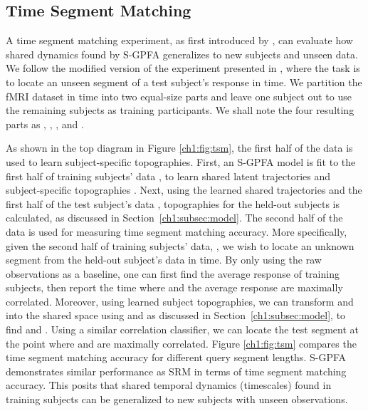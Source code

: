 \subsection{Time Segment Matching}
A time segment matching experiment, as first introduced by \cite{ha}, can evaluate how shared dynamics found by S-GPFA generalizes to new subjects and unseen data. We follow the modified version of the experiment presented in \cite{srm}, where the task is to locate an unseen segment of a test subject's response in time. We partition the fMRI dataset in time into two equal-size parts and leave one subject out to use the remaining subjects as training participants. We shall note the four resulting parts as , , , and .

As shown in the top diagram in Figure \ref{ch1:fig:tsm}, the first half of the data is used to learn subject-specific topographies. First, an S-GPFA model is fit to the first half of training subjects' data , to learn shared latent trajectories  and subject-specific topographies \wtrain. Next, using the learned shared trajectories  and the first half of the test subject's data , topographies for the held-out subjects \wtest is calculated, as discussed in Section~\ref{ch1:subsec:model}. The second half of the data is used for measuring time segment matching accuracy. More specifically, given the second half of training subjects' data, , we wish to locate an unknown segment from the held-out subject's data \yseg in time. By only using the raw observations as a baseline, one can first find the average response of training subjects, then report the time where \yseg and the average response are maximally correlated. Moreover, using learned subject topographies, we can transform  and \yseg into the shared space using \wtrain and \wtest as discussed in Section~\ref{ch1:subsec:model}, to find  and \xseg. Using a similar correlation classifier, we can locate the test segment at the point where  and \xseg are maximally correlated. Figure \ref{ch1:fig:tsm} compares the time segment matching accuracy for different query segment lengths. S-GPFA demonstrates similar performance as SRM in terms of time segment matching accuracy. This posits that shared temporal dynamics (timescales) found in training subjects can be generalized to new subjects with unseen observations. 

